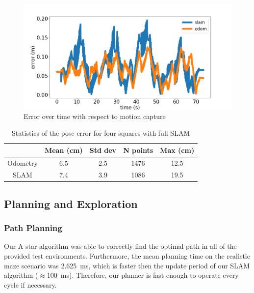 \documentclass[journal]{IEEEtran}
\begin{document}
            \begin{figure}[ht]
                \centering
                \includegraphics[width=1\linewidth]{slam_squares_error.png}
                \caption{Error over time with respect to motion capture}
                \label{fig:slam_squares_error}
            \end{figure}
            
            \begin{table}[ht]
                \centering
                \begin{tabular}{|c|c|c|c|c|} \hline
                  & Mean (cm) &   Std dev & N points & Max (cm) \\ \hline
                  Odometry & 6.5 & 2.5 & 1476 & 12.5 \\ \hline
                  SLAM & 7.4 & 3.9 & 1086 & 19.5 \\ \hline
                \end{tabular}
                \caption{Statistics of the pose error for four squares with full SLAM}
                \label{tab:slam_error}
            \end{table}
    
    \subsection{Planning and Exploration}
    
        \subsubsection{Path Planning}
        
            Our A star algorithm was able to correctly find the optimal path in all of the provided test environments. Furthermore, the mean planning time on the realistic maze scenario was \SI{2.625}{\milli\second}, which is faster then the update period of our SLAM algorithm ($\approx$\SI{100}{\milli\second}). Therefore, our planner is fast enough to operate every cycle if necessary.
            
\end{document}
